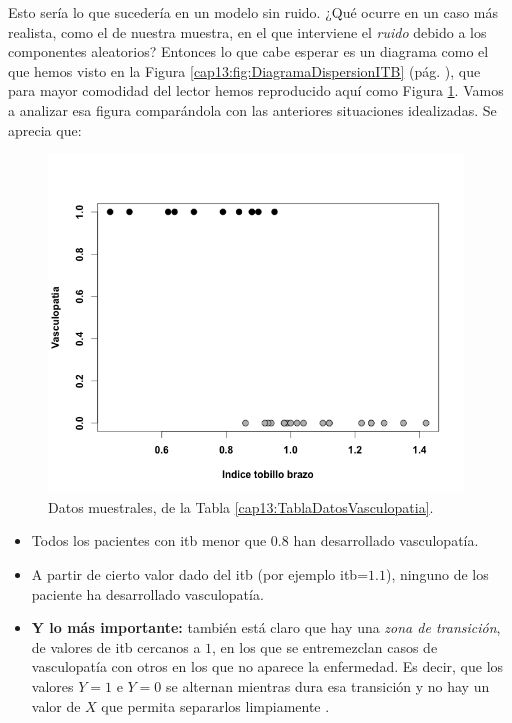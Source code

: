 \begin{ejemplo}
Esto sería  lo que sucedería en un modelo sin ruido. ¿Qué ocurre en un caso más realista, como el de nuestra muestra, en el que interviene el {\em ruido} debido a los componentes aleatorios? Entonces lo que cabe esperar es un diagrama como el que hemos visto en la Figura \ref{cap13:fig:DiagramaDispersionITB} (pág. \pageref{cap13:fig:DiagramaDispersionITB}), que para mayor comodidad del lector hemos reproducido aquí como Figura \ref{cap13:fig:DiagramaDispersionITBrepe}. Vamos a analizar esa figura comparándola con las anteriores situaciones idealizadas. Se aprecia que:

	\begin{figure}[htb]
		\begin{center}
        \includegraphics[width=11cm]{../fig/Cap13-DiagramaDispersionITB.png}
        \caption{Datos muestrales, de la Tabla \ref{cap13:TablaDatosVasculopatia}. }
		\label{cap13:fig:DiagramaDispersionITBrepe}
		\end{center}
	\end{figure}


\begin{itemize}
  \item Todos los pacientes con itb menor que $0.8$ han desarrollado vasculopatía.

  \item A partir de cierto valor dado del itb (por ejemplo itb=$1.1$), ninguno de los paciente ha desarrollado vasculopatía.

  \item {\bf Y lo más importante:} también está claro que hay una {\em zona de transición}, de valores de itb cercanos a $1$, en los que se entremezclan casos de vasculopatía con otros en los que no aparece la  enfermedad. Es decir, que los valores $Y=1$ e $Y=0$ se alternan mientras dura esa transición y no hay un valor de $X$ que permita separarlos limpiamente .


\end{itemize}
\end{ejemplo}
